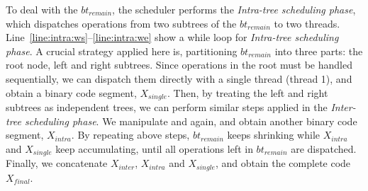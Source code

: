 To deal with the $bt_{remain}$, 
the scheduler performs the \textit{Intra-tree scheduling phase}, 
which dispatches operations from two subtrees of the $bt_{remain}$ to two threads.
Line~\ref{line:intra:ws}--\ref{line:intra:we} show a while loop for \textit{Intra-tree scheduling phase}.
A crucial strategy applied here is, partitioning $bt_{remain}$ into three parts:
the root node, left and right subtrees.
Since operations in the root must be handled sequentially, 
we can dispatch them directly with a single thread (thread 1), 
and obtain a binary code segment, $X_{single}$.
Then, by treating the left and right subtrees as independent trees, 
we can perform similar steps applied in the \textit{Inter-tree scheduling phase}.
We manipulate  and  again, and obtain another binary code segment, $X_{intra}$.
By repeating above steps, $bt_{remain}$ keeps shrinking while $X_{intra}$ and $X_{single}$ keep accumulating,
until all operations left in $bt_{remain}$ are dispatched.
Finally, we concatenate $X_{inter}$, $X_{intra}$ and $X_{single}$,
and obtain the complete code $X_{final}$.

